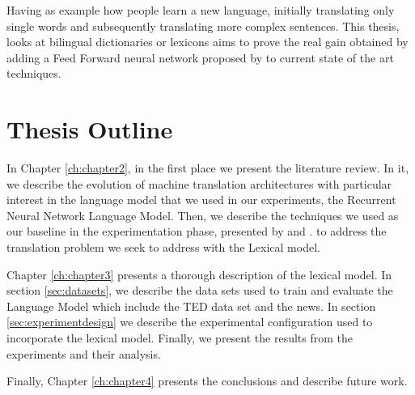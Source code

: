 Having as example how people learn a new language, initially translating only single words and subsequently translating more complex sentences. This thesis, looks at bilingual dictionaries or lexicons aims to prove the real gain obtained by adding a Feed Forward neural network proposed by \citet{DBLP:journals/corr/BahdanauCB14} to current state of the art techniques.

\section{Thesis Outline}

In Chapter \ref{ch:chapter2}, in the first place we present the literature review. In it, we describe the evolution of machine translation architectures with particular interest in the language model that we used in our experiments, the Recurrent Neural Network Language Model. Then, we describe the techniques we used as our baseline in the experimentation phase, presented by \citet{DBLP:journals/corr/SennrichHB15} and \citet{DBLP:journals/corr/ZophYMK16}. to address the translation problem we seek to address with the Lexical model. 

Chapter \ref{ch:chapter3} presents a thorough description of the lexical model. In section \ref{sec:datasets}, we describe the data sets used to train and evaluate the Language Model which include the TED data set \citep{TIEDEMANN12.463} and the news. In section \ref{sec:experimentdesign} we describe the experimental configuration used to incorporate the lexical model. Finally, we present the results from the experiments and their analysis.

Finally, Chapter \ref{ch:chapter4} presents the conclusions and describe future work.